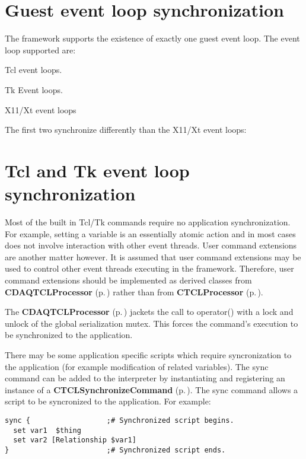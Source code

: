 \section{Guest event loop synchronization}\label{Synchronization}


The framework supports the existence of exactly one guest event loop.  The event loop supported are:\begin{CompactItemize}
\item 
Tcl event loops.\item 
Tk Event loops.\item 
X11/Xt event loops\end{CompactItemize}
The first two synchronize differently than the X11/Xt event loops:

\section{Tcl and Tk event loop synchronization}\label{TCLSynchronization}


Most of the built in Tcl/Tk commands require no application synchronization.  For example, setting a variable is an essentially atomic action and in most cases does not involve interaction with other event threads. User command extensions are another matter however. It is assumed that user command  extensions may be used to control other event threads executing in the  framework. Therefore, user command extensions should be implemented as  derived classes from {\bf CDAQTCLProcessor} {\rm (p.\,\pageref{classCDAQTCLProcessor})} rather than from {\bf CTCLProcessor} {\rm (p.\,\pageref{classCTCLProcessor})}.

The {\bf CDAQTCLProcessor} {\rm (p.\,\pageref{classCDAQTCLProcessor})} jackets the call to operator() with a lock and unlock of the global serialization mutex. This forces the command's execution to be synchronized to the  application.

There may be some application specific scripts which require syncronization to the application (for example modification of related variables). The sync command can be added to the interpreter by instantiating and registering an instance of a {\bf CTCLSynchronize\-Command} {\rm (p.\,\pageref{classCTCLSynchronizeCommand})}. The sync command allows a script to be syncronized to the application. For example:



\footnotesize\begin{verbatim}sync {                  ;# Synchronized script begins.
  set var1  $thing
  set var2 [Relationship $var1]
}                       ;# Synchronized script ends.
\end{verbatim}\normalsize 


